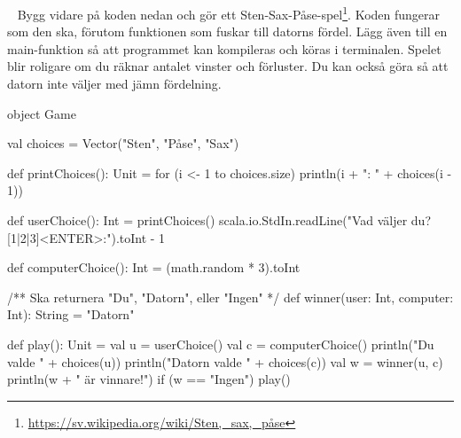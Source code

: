 %
%
%
%
%
%
%
%
%
%
%
%
%
%
%
%
%
%
%
%
%
%
%
%
%
%
%
%
%
%
%
%
















\newpage

\AdvancedTasks %






\QUESTBEGIN

\Task  \what~ Bygg vidare på koden nedan och gör ett Sten-Sax-Påse-spel\footnote{\url{https://sv.wikipedia.org/wiki/Sten,_sax,_påse}}. Koden fungerar som den ska, förutom funktionen  som fuskar till datorns fördel. Lägg även till en main-funktion så att programmet kan kompileras och köras i terminalen. Spelet blir roligare om du räknar antalet vinster och förluster. Du kan också göra så att datorn inte väljer med jämn fördelning.

\begin{Code}
object Game {
  val choices = Vector("Sten", "Påse", "Sax")

  def printChoices(): Unit =
    for (i <- 1 to choices.size) println(i + ": " + choices(i - 1))

  def userChoice(): Int = {
    printChoices()
    scala.io.StdIn.readLine("Vad väljer du? [1|2|3]<ENTER>:").toInt - 1
  }

  def computerChoice(): Int = (math.random * 3).toInt

  /** Ska returnera "Du", "Datorn", eller "Ingen" */
  def winner(user: Int, computer: Int): String = "Datorn"

  def play(): Unit = {
    val u = userChoice()
    val c = computerChoice()
    println("Du valde " + choices(u))
    println("Datorn valde " + choices(c))
    val w = winner(u, c)
    println(w + " är vinnare!")
    if (w == "Ingen") play()
  }
}
\end{Code}


